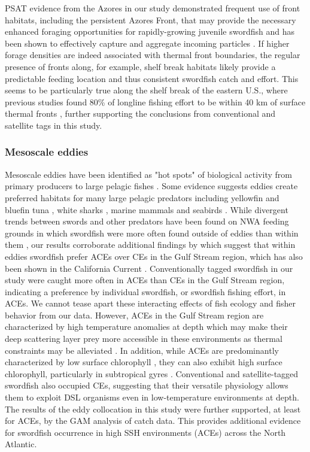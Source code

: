 PSAT evidence from the Azores in our study demonstrated frequent use of front habitats, including the persistent Azores Front, that may provide the necessary enhanced foraging opportunities for rapidly-growing juvenile swordfish and has been shown to effectively capture and aggregate incoming particles \citep{Sala2016}. If higher forage densities are indeed associated with thermal front boundaries, the regular presence of fronts along, for example, shelf break habitats likely provide a predictable feeding location and thus consistent swordfish catch and effort. This seems to be particularly true along the shelf break of the eastern U.S., where previous studies found 80\% of longline fishing effort to be within 40 km of surface thermal fronts \citep{Podesta1993}, further supporting the conclusions from conventional and satellite tags in this study.

\subsubsection{Mesoscale eddies}

Mesoscale eddies have been identified as "hot spots" of biological activity from primary producers \citep{McGillicuddy2007} to large pelagic fishes \citep{Hobday2014, Gaube2018}. Some evidence suggests eddies create preferred habitats for many large pelagic predators including yellowfin and bluefin tuna \citep{Teo2007, Hsu2015}, white sharks \citep{Gaube2018}, marine mammals \citep{Bailleul2010} and seabirds \citep{TewKai2009}. While divergent trends between swords and other predators have been found on NWA feeding grounds in which swordfish were more often found outside of eddies than within them \citep{Hsu2015}, our results corroborate additional findings by \citet{Hsu2015} which suggest that within eddies swordfish prefer ACEs over CEs in the Gulf Stream region, which has also been shown in the California Current \citep{Scales2017}. Conventionally tagged swordfish in our study were caught more often in ACEs than CEs in the Gulf Stream region, indicating a preference by individual swordfish, or swordfish fishing effort, in ACEs. We cannot tease apart these interacting effects of fish ecology and fisher behavior from our data. However, ACEs in the Gulf Stream region are characterized by high temperature anomalies at depth which may make their deep scattering layer prey more accessible in these environments as thermal constraints may be alleviated \citep{Gaube2018}. In addition, while ACEs are predominantly characterized by low surface chlorophyll \citep{Gaube2014}, they can also exhibit high surface chlorophyll, particularly in subtropical gyres \citep{Dufois2016}. Conventional and satellite-tagged swordfish also occupied CEs, suggesting that their versatile physiology allows them to exploit DSL organisms even in low-temperature environments at depth. The results of the eddy collocation in this study were further supported, at least for ACEs, by the GAM analysis of catch data. This provides additional evidence for swordfish occurrence in high SSH environments (ACEs) across the North Atlantic.

